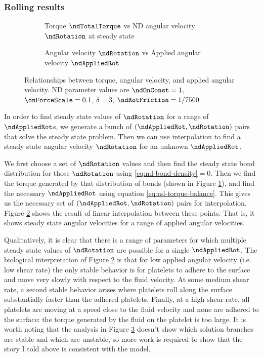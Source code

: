 \subsubsection{Rolling results}
\label{sec:rolling-results}

\begin{figure}
  \centering
  \begin{subfigure}{.48\textwidth}

    \caption{Torque $\ndTotalTorque$ vs ND angular velocity
      $\ndRotation$ at steady state}
    \label{fig:tau-vs-omega}
  \end{subfigure}
  \hfill
  \begin{subfigure}{.48\textwidth}

    \caption{Angular velocity $\ndRotation$ vs Applied angular
      velocity $\ndAppliedRot$}
    \label{fig:omega-vs-omega_f}
  \end{subfigure}
  \caption{Relationships between torque, angular velocity, and applied
    angular velocity. ND parameter values are $\ndOnConst = 1$,
    $\onForceScale = 0.1$, $\delta = 3$, $\ndRotFriction = 1/7500$.}
  \label{fig:steady-state-rolling}
\end{figure}

In order to find steady state values of $\ndRotation$ for a range of
$\ndAppliedRot$s, we generate a bunch of
$(\ndAppliedRot, \ndRotation)$ pairs that solve the steady state
problem. Then we can use interpolation to find a steady state angular
velocity $\ndRotation$ for an unknown $\ndAppliedRot$.

We first choose a set of $\ndRotation$ values and then find the steady
state bond distribution for those $\ndRotation$ using
\eqref{eq:nd-bond-density}$= 0$. Then we find the torque generated by that
distribution of bonds (shown in Figure \ref{fig:tau-vs-omega}), and
find the necessary $\ndAppliedRot$ using equation
\eqref{eq:nd-torque-balance}. This gives us the necessary set of
$(\ndAppliedRot, \ndRotation)$ pairs for interpolation. Figure
\ref{fig:omega-vs-omega_f} shows the result of linear interpolation
between these points. That is, it shows steady state angular
velocities for a range of applied angular velocities.

Qualitatively, it is clear that there is a range of parameters for
which multiple steady state values of $\ndRotation$ are possible for a
single $\ndAppliedRot$. The biological interpretation of Figure
\ref{fig:omega-vs-omega_f} is that for low applied angular velocity
(i.e. low shear rate) the only stable behavior is for platelets to
adhere to the surface and move very slowly with respect to the fluid
velocity. At some medium shear rate, a second stable behavior arises
where platelets roll along the surface substantially faster than the
adhered platelets. Finally, at a high shear rate, all platelets are
moving at a speed close to the fluid velocity and none are adhered to
the surface: the torque generated by the fluid on the platelet is too
large. It is worth noting that the analysis in Figure
\ref{fig:steady-state-rolling} doesn't show which solution branches
are stable and which are unstable, so more work is required to show
that the story I told above is consistent with the model.

